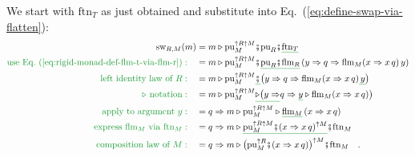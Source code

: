 We start with $\text{ftn}_{T}$ as just obtained and substitute into
Eq.~(\ref{eq:define-swap-via-flatten}):
\begin{align}
\text{sw}_{R,M}(m) & =m\triangleright\text{pu}_{M}^{\uparrow R\uparrow M}\bef\text{pu}_{R}\bef\gunderline{\text{ftn}_{T}}\nonumber \\
{\color{greenunder}\text{use Eq.~(\ref{eq:rigid-monad-def-flm-t-via-flm-r})}:}\quad & =m\triangleright\text{pu}_{M}^{\uparrow R\uparrow M}\bef\gunderline{\text{pu}_{R}\bef\text{flm}_{R}}\left(y\Rightarrow q\Rightarrow\text{flm}_{M}(x\Rightarrow x\,q)\,y\right)\nonumber \\
{\color{greenunder}\text{left identity law of }R:}\quad & =m\triangleright\text{pu}_{M}^{\uparrow R\uparrow M}\gunderline{\bef}\big(y\Rightarrow q\Rightarrow\text{flm}_{M}(x\Rightarrow x\,q)\gunderline{\,y}\big)\nonumber \\
{\color{greenunder}\triangleright\text{ notation}:}\quad & =m\triangleright\text{pu}_{M}^{\uparrow R\uparrow M}\gunderline{\triangleright\big(y\Rightarrow}q\Rightarrow\gunderline y\triangleright\text{flm}_{M}(x\Rightarrow x\,q)\big)\\
{\color{greenunder}\text{apply to argument }y:}\quad & =q\Rightarrow m\triangleright\text{pu}_{M}^{\uparrow R\uparrow M}\triangleright\gunderline{\text{flm}_{M}}\left(x\Rightarrow x\,q\right)\nonumber \\
{\color{greenunder}\text{express }\text{flm}_{M}\text{ via }\text{ftn}_{M}:}\quad & =q\Rightarrow m\triangleright\gunderline{\text{pu}_{M}^{\uparrow R\uparrow M}\bef(x\Rightarrow x\,q)^{\uparrow M}}\bef\text{ftn}_{M}\nonumber \\
{\color{greenunder}\text{composition law of }M:}\quad & =q\Rightarrow m\triangleright\big(\text{pu}_{M}^{\uparrow R}\bef(x\Rightarrow x\,q)\big)^{\uparrow M}\bef\text{ftn}_{M}\quad.\label{eq:rigid-monad-swap-derivation2}
\end{align}
